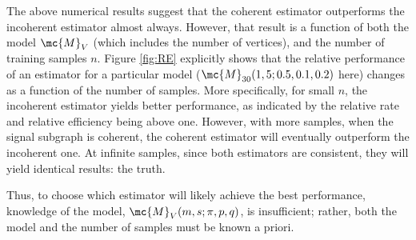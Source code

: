 \documentclass[10pt,journal,cspaper,compsoc]{IEEEtran}
\begin{document}
The above numerical results suggest that the coherent estimator outperforms the incoherent estimator almost always.  However, that result is a function of both the model $\mc{M}_V$ (which includes the number of vertices), and the number of training samples $n$.  %
Figure \ref{fig:RE} explicitly shows that the relative performance of an estimator for a particular model ($\mc{M}_{30}(1,5;0.5,0.1,0.2)$ here) changes as a function of the number of samples.  More specifically, for small $n$, the incoherent estimator yields better performance, as indicated by the relative rate and relative efficiency being above one.  However, with more samples, when the signal subgraph is coherent, the coherent estimator will eventually outperform the incoherent one.  At infinite samples, since both estimators are consistent, they will yield identical results: the truth.  

Thus, to choose which estimator will likely achieve the best performance, knowledge of the model, $\mc{M}_V(m,s;\pi,p,q)$, is insufficient; rather, both the model and the number of samples must be known a priori.  
\end{document}
